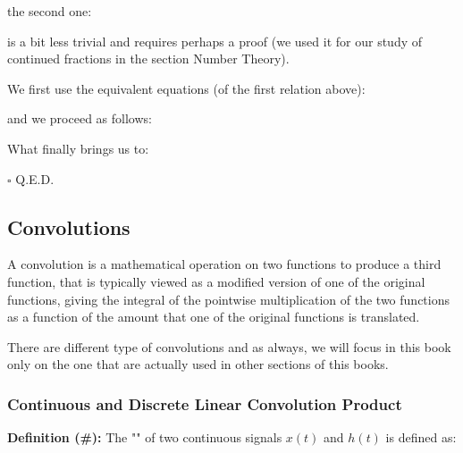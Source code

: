 	the second one:
	
	is a bit less trivial and requires perhaps a proof (we used it for our study of continued fractions in the section Number Theory).
	\begin{dem}
	We first use the equivalent equations (of the first relation above):
	
	and we proceed as follows:
	
	What finally brings us to:
	
	\begin{flushright}
		$\square$  Q.E.D.
	\end{flushright}
	\end{dem}
	
	\pagebreak
	\subsection{Convolutions}\label{convolution}
	A convolution is a mathematical operation on two functions to produce a third function, that is typically viewed as a modified version of one of the original functions, giving the integral of the pointwise multiplication of the two functions as a function of the amount that one of the original functions is translated.
	
	There are different type of convolutions and as always, we will focus in this book only on the one that are actually used in other sections of this books.
	\subsubsection{Continuous and Discrete Linear Convolution Product}
	\textbf{Definition (\#\mydef):} The "" of two continuous signals $x(t)$ and $h(t)$ is defined as:
	
